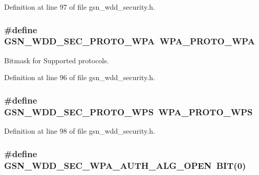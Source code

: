 Definition at line 97 of file gsn\_\-wdd\_\-security.h.

\hypertarget{a00604_abf0fb4b161dfe7d73925179a0e056b66}{
\subsubsection[{GSN\_\-WDD\_\-SEC\_\-PROTO\_\-WPA}]{\setlength{\rightskip}{0pt plus 5cm}\#define GSN\_\-WDD\_\-SEC\_\-PROTO\_\-WPA~WPA\_\-PROTO\_\-WPA}}
\label{a00604_abf0fb4b161dfe7d73925179a0e056b66}


Bitmask for Supported protocols. 



Definition at line 96 of file gsn\_\-wdd\_\-security.h.

\hypertarget{a00604_a7b2c83606d076c8c709d84768c8dc4a9}{
\subsubsection[{GSN\_\-WDD\_\-SEC\_\-PROTO\_\-WPS}]{\setlength{\rightskip}{0pt plus 5cm}\#define GSN\_\-WDD\_\-SEC\_\-PROTO\_\-WPS~WPA\_\-PROTO\_\-WPS}}
\label{a00604_a7b2c83606d076c8c709d84768c8dc4a9}


Definition at line 98 of file gsn\_\-wdd\_\-security.h.

\hypertarget{a00604_ae8c55ea06d8f6eabb46d267a1b04137c}{
\subsubsection[{GSN\_\-WDD\_\-SEC\_\-WPA\_\-AUTH\_\-ALG\_\-OPEN}]{\setlength{\rightskip}{0pt plus 5cm}\#define GSN\_\-WDD\_\-SEC\_\-WPA\_\-AUTH\_\-ALG\_\-OPEN~BIT(0)}}
\label{a00604_ae8c55ea06d8f6eabb46d267a1b04137c}



